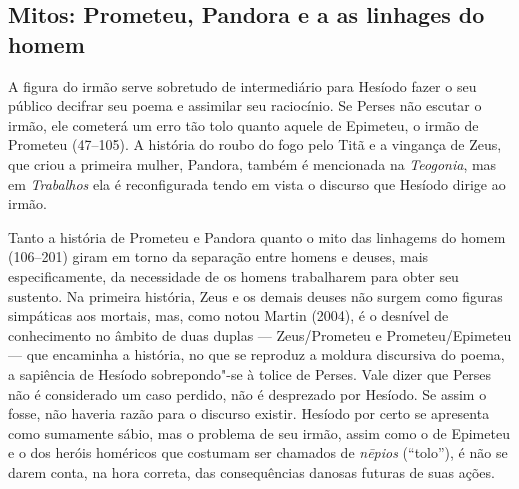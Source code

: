 
\subsection{Mitos: Prometeu, Pandora e a as linhages do homem}

A figura do irmão serve sobretudo de intermediário para Hesíodo
fazer o seu público decifrar seu poema e assimilar seu raciocínio. Se
Perses não escutar o irmão, ele cometerá um erro tão tolo quanto aquele
de Epimeteu, o irmão de Prometeu (47--105). A história do roubo do fogo
pelo Titã e a vingança de Zeus, que criou a primeira mulher, Pandora,
também é mencionada na \emph{Teogonia}, mas em \emph{Trabalhos} ela é
reconfigurada tendo em vista o discurso que Hesíodo dirige ao irmão.

Tanto a história de Prometeu e Pandora quanto o mito das linhagems do
homem (106--201) giram em torno da separação entre homens e deuses, mais
especificamente, da necessidade de os homens trabalharem para obter seu
sustento. Na primeira história, Zeus e os demais deuses não surgem como
figuras simpáticas aos mortais, mas, como notou Martin (2004), é o
desnível de conhecimento no âmbito de duas duplas --- Zeus/Prometeu e
Prometeu/Epimeteu --- que encaminha a história, no que se reproduz a
moldura discursiva do poema, a sapiência de Hesíodo sobrepondo"-se à
tolice de Perses. Vale dizer que Perses não é considerado um caso
perdido, não é desprezado por Hesíodo. Se assim o fosse, não haveria
razão para o discurso existir. Hesíodo por certo se apresenta como
sumamente sábio, mas o problema de seu irmão, assim como o de Epimeteu e
o dos heróis homéricos que costumam ser chamados de \emph{nēpios}
(``tolo''), é não se darem conta, na hora correta, das consequências
danosas futuras de suas ações.

